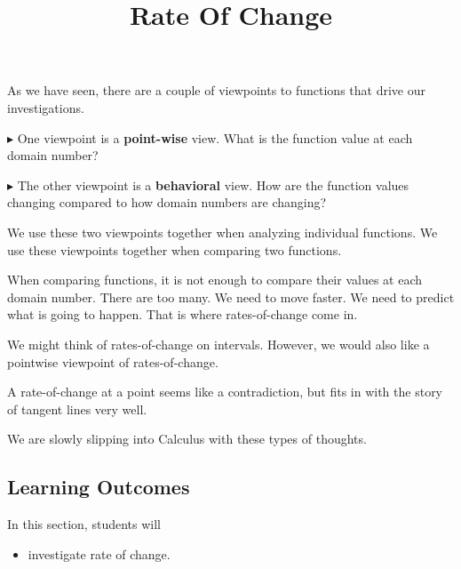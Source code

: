 \documentclass{ximera}
\title{Rate Of Change}
\begin{document}
\begin{abstract}
\end{abstract}
\maketitle







As we have seen, there are a couple of viewpoints to functions that drive our investigations.

$\blacktriangleright$ One viewpoint is a \textbf{\textcolor{purple!85!blue}{point-wise}} view.  What is the function value at each domain number? 


$\blacktriangleright$ The other viewpoint is a \textbf{\textcolor{purple!85!blue}{behavioral}} view.  How are the function values changing compared to how domain numbers are changing? 



We use these two viewpoints together when analyzing individual functions.  We use these viewpoints together when comparing two functions. 

When comparing functions, it is not enough to compare their values at each domain number.  There are too many.  We need to move faster.  We need to predict what is going to happen. That is where rates-of-change come in. 




We might think of rates-of-change on intervals.  However, we would also like a pointwise viewpoint of rates-of-change. 



A rate-of-change at a point seems like a contradiction, but fits in with the story of tangent lines very well.



We are slowly slipping into Calculus with these types of thoughts.









\subsection*{Learning Outcomes}


\begin{sectionOutcomes}
In this section, students will 

\begin{itemize}
\item investigate rate of change.

\end{itemize}
\end{sectionOutcomes}
\end{document}
